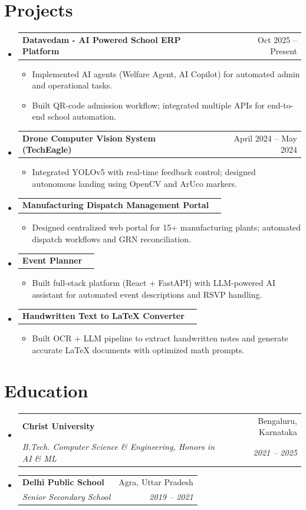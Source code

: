 \documentclass[letterpaper,10pt]{article}
\makeatletter
\newcommand{\resumeItem}[1]{
  \item\small{
    {#1 \vspace{-1pt}}
  }
}
\newcommand{\resumeSubheading}[4]{
  \vspace{-1pt}\item
    \begin{tabular*}{0.97\textwidth}[t]{l@{\extracolsep{\fill}}r}
      \textbf{#1} & #2 \\
      \textit{\small #3} & \textit{\small #4} \\
    \end{tabular*}\vspace{-5pt}
}
\newcommand{\resumeProjectHeading}[2]{
    \item
    \begin{tabular*}{0.97\textwidth}{l@{\extracolsep{\fill}}r}
      \small#1 & #2 \\
    \end{tabular*}\vspace{-1pt}
}
\newcommand{\resumeSubHeadingListStart}{\begin{itemize}[leftmargin=0.15in, label={}]}
\newcommand{\resumeSubHeadingListEnd}{\end{itemize}\vspace{-5pt}}
\newcommand{\resumeItemListStart}{\begin{itemize}\vspace{-3pt}}
\newcommand{\resumeItemListEnd}{\end{itemize}\vspace{-2pt}}
\makeatother
\begin{document}
\section{Projects}
\resumeSubHeadingListStart
    \resumeProjectHeading
      {\textbf{Datavedam - AI Powered School ERP Platform}}{Oct 2025 -- Present}
      \resumeItemListStart
        \resumeItem{Implemented AI agents (Welfare Agent, AI Copilot) for automated admin and operational tasks.}
        \resumeItem{Built QR-code admission workflow; integrated multiple APIs for end-to-end school automation.}
      \resumeItemListEnd
    \resumeProjectHeading
      {\textbf{Drone Computer Vision System (TechEagle)}}{April 2024 -- May 2024}
      \resumeItemListStart
        \resumeItem{Integrated YOLOv5 with real-time feedback control; designed autonomous landing using OpenCV and ArUco markers.}
      \resumeItemListEnd
    \resumeProjectHeading
      {\textbf{Manufacturing Dispatch Management Portal}}{}
      \resumeItemListStart
        \resumeItem{Designed centralized web portal for 15+ manufacturing plants; automated dispatch workflows and GRN reconciliation.}
      \resumeItemListEnd
    \resumeProjectHeading
      {\textbf{Event Planner}}{}
      \resumeItemListStart
        \resumeItem{Built full-stack platform (React + FastAPI) with LLM-powered AI assistant for automated event descriptions and RSVP handling.}
      \resumeItemListEnd
    \resumeProjectHeading
      {\textbf{Handwritten Text to LaTeX Converter}}{}
      \resumeItemListStart
        \resumeItem{Built OCR + LLM pipeline to extract handwritten notes and generate accurate LaTeX documents with optimized math prompts.}
      \resumeItemListEnd
\resumeSubHeadingListEnd

\section{Education}
\resumeSubHeadingListStart
    \resumeSubheading
      {Christ University}{Bengaluru, Karnataka}
      {B.Tech. Computer Science \& Engineering, Honors in AI \& ML}{2021 -- 2025}
    \resumeSubheading
      {Delhi Public School}{Agra, Uttar Pradesh}
      {Senior Secondary School}{2019 -- 2021}
\resumeSubHeadingListEnd
\end{document}
